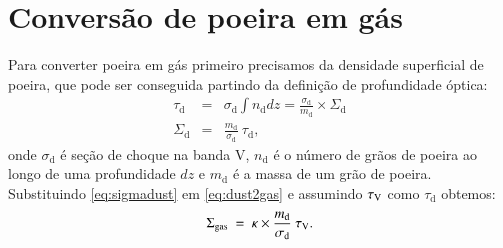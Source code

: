 \section{Conversão de poeira em gás}
\label{sec:gasfrac:gas2dust}

Para converter poeira em gás primeiro precisamos da densidade superficial de poeira, que pode ser
conseguida partindo da definição de profundidade óptica:
\begin{eqnarray}
	\tau_{\mathrm{d}} &=& \sigma_{\mathrm{d}} \int n_{\mathrm{d}} dz =
	\frac{\sigma_{\mathrm{d}}}{m_{\mathrm{d}}}\times\Sigma_{\mathrm{d}}
	\\
	\Sigma_{\mathrm{d}} &=& \frac{m_{\mathrm{d}}}{\sigma_{\mathrm{d}}}\ \tau_{\mathrm{d}},
	\label{eq:sigmadust}
\end{eqnarray}
\noindent onde $\sigma_{\mathrm{d}}$ é seção de choque na banda V, $n_{\mathrm{d}}$ é o número de
grãos de poeira ao longo de uma profundidade $dz$ e $m_{\mathrm{d}}$ é a massa de um grão de poeira.
Substituindo \eqref{eq:sigmadust} em \eqref{eq:dust2gas} e assumindo $\tau_{\mathrm{V}}$ como $\tau_{\mathrm{d}}$ obtemos:
\begin{equation}
	\Sigma_{\mathrm{gas}}\ =\ \kappa \times \frac{m_{\mathrm{d}}}{\sigma_{\mathrm{d}}}\ \tau_{\mathrm{V}}. 
	\label{eq:dust2gas_tauV}
\end{equation}

